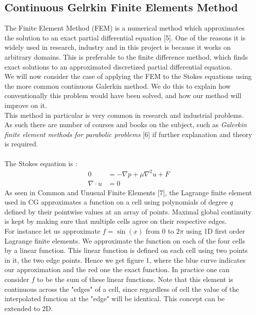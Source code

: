 \documentclass[11pt,twoside,a4paper]{article}
\begin{document}
\subsection{Continuous Gelrkin Finite Elements Method}
The Finite Element Method (FEM) is a numerical method which approximates the solution to an exact partial differential equation [5]. One of the reasons it is widely used in research, industry and in this project is because it works on arbitrary domains. This is preferable to the finite difference method, which finds exact solutions to an approximated discretized partial differential equation.\\
We will now consider the case of applying the FEM to the Stokes equations using the more common continuous Galerkin method. We do this to explain how conventionally this problem would have been solved, and how our method will improve on it.\\
This method in particular is very common in research and industrial problems. As such there are number of courses and books on the subject, such as \textit{Galerkin finite element methods for parabolic problems} [6] if further explanation and theory is required.\\
\\
The Stokes equation is :
\begin{align}
0 &= -\nabla p + \mu \nabla^2 u + F \\
\nabla \cdot u &= 0
\end{align}
As seen in Common and Unusual Finite Elements [7], the Lagrange finite element used in CG approximates a function on a cell using polynomials of degree $q$ defined by their pointwise values at an array of points. Maximal global continuity is kept by making sure  that multiple cells agree on their respective edges.\\
For instance let us approximate $f = \sin(x)$ from $0$ to $2 \pi$ using 1D first order Lagrange finite elements. We approximate the function on each of the four cells by a linear function. This linear function is defined on each cell using two points in it, the two edge points. Hence we get figure 1, where the blue curve indicates our approximation and the red one the exact function. In practice one can consider $f$ to be the sum of these linear functions. Note that this element is continuous across the "edges" of a cell, since regardless of cell the value of the interpolated function at the "edge" will be identical. This concept can be extended to 2D.\\
\end{document}
